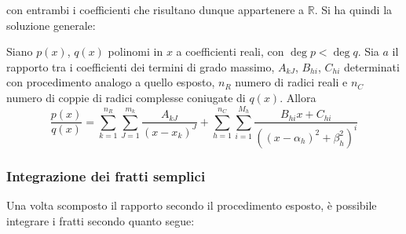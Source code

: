 \documentclass[10pt, oneside]{book}
\theoremstyle{plain}
\begin{document}
con entrambi i coefficienti che risultano dunque appartenere a $\mathbb{R}$.
Si ha quindi la soluzione generale:
\begin{ther}
    Siano $p(x)$, $q(x)$ polinomi in $x$ a coefficienti reali, con $\deg p < \deg q$. Sia $a$ il rapporto tra i coefficienti dei termini di grado massimo, $A_{kJ}$, $B_{hi}$, $C_{hi}$ determinati con procedimento analogo a quello esposto, $n_R$ numero di radici reali  e $n_C$ numero di coppie di radici complesse coniugate di $q(x)$. Allora
    \[\frac{p(x)}{q(x)} = \sum \limits_{k = 1}^{n_R} \sum \limits_{J = 1}^{m_k}\frac{A_{kJ}}{(x-x_k)^J} + \sum \limits_{h = 1}^{n_C} \sum \limits_{i = 1}^{M_h}\frac{B_{hi} x + C_{hi}}{((x - \alpha_h)^2 + \beta_h^2 )^i}\]
\end{ther}

\subsubsection*{Integrazione dei fratti semplici}
Una volta scomposto il rapporto secondo il procedimento esposto, è possibile integrare i fratti secondo quanto segue:
\end{document}
